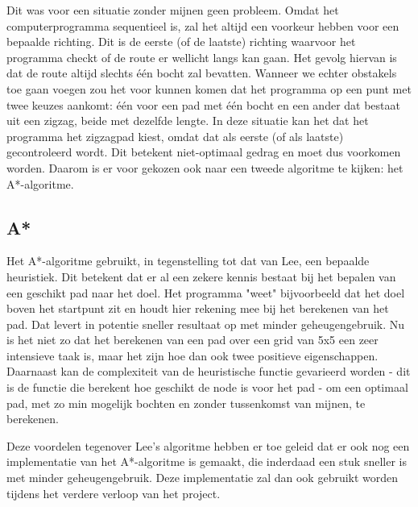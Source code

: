 \documentclass{report}
\begin{document}
Dit was voor een situatie zonder mijnen geen probleem. Omdat het computerprogramma sequentieel is, zal het altijd een voorkeur hebben voor een bepaalde richting. Dit is de eerste (of de laatste) richting waarvoor het programma checkt of de route er wellicht langs kan gaan. Het gevolg hiervan is dat de route altijd slechts één bocht zal bevatten. Wanneer we echter obstakels toe gaan voegen zou het voor kunnen komen dat het programma op een punt met twee keuzes aankomt: één voor een pad met één bocht en een ander dat bestaat uit een zigzag, beide met dezelfde lengte. In deze situatie kan het dat het programma het zigzagpad kiest, omdat dat als eerste (of als laatste) gecontroleerd wordt. Dit betekent niet-optimaal gedrag en moet dus voorkomen worden. Daarom is er voor gekozen ook naar een tweede algoritme te kijken: het A*-algoritme.

\subsection{A*}
\label{ssec:astar}

Het A*-algoritme gebruikt, in tegenstelling tot dat van Lee, een bepaalde heuristiek. Dit betekent dat er al een zekere kennis bestaat bij het bepalen
van een geschikt pad naar het doel. Het programma "weet" bijvoorbeeld dat het doel boven het startpunt zit en houdt hier rekening mee bij het berekenen van het pad. Dat levert in potentie sneller resultaat op met minder geheugengebruik. Nu is het niet zo dat het berekenen van een pad over een grid van 5x5 een zeer intensieve taak is, maar het zijn hoe dan ook twee positieve eigenschappen. Daarnaast kan de complexiteit van de heuristische functie gevarieerd worden - dit is de functie die berekent hoe geschikt de node is voor het pad - om een optimaal pad, met zo min mogelijk bochten en zonder tussenkomst van mijnen, te berekenen.

Deze voordelen tegenover Lee's algoritme hebben er toe geleid dat er ook nog een implementatie van het A*-algoritme is gemaakt, die inderdaad een stuk sneller is met minder geheugengebruik. Deze implementatie zal dan ook gebruikt worden tijdens het verdere verloop van het project.
\end{document}
